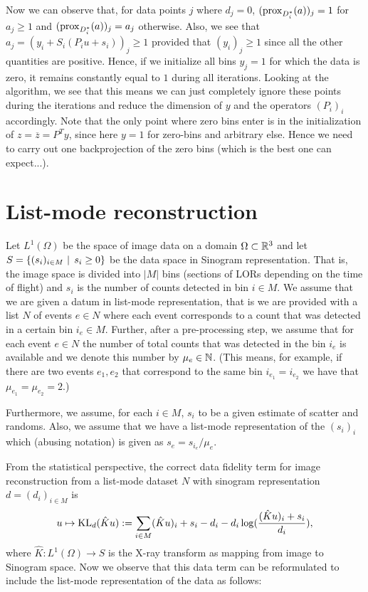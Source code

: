 \documentclass{article}
\begin{document}
Now we can observe that, for data points $j$ where $d_j = 0$, $(\operatorname{prox}_{D_i^*}(a))_j = 1$ for $a_j \geq 1$ and $(\operatorname{prox}_{D_i^*}(a))_j = a_j$ otherwise. Also, we see that $ a_j = (y_i + S_i (P_iu + s_i) )_j \geq 1$ provided that $(y_i)_j \geq 1$ since all the other quantities are positive. Hence, if we initialize all bins $y_j = 1$ for which the data is zero, it remains constantly equal to $1$ during all iterations. Looking at the algorithm, we see that this means we can just completely ignore these points during the iterations and reduce the dimension of $y$ and the operators $(P_i)_i$ accordingly. Note that the only point where zero bins enter is in the initialization of $z = \overline{z} = P^Ty$, since here $y = 1$ for zero-bins and arbitrary else. Hence we need to carry out one backprojection of the zero bins (which is the best one can expect...).

\section{List-mode reconstruction}

Let $L^1(\Omega)$ be the space of image data on a domain $\Omega \subset \mathbb{R}^3$ and let $S = \{ (s_i)_{i \in M} \, \left|\right.\, s_i \geq 0 \}$ be the data space in Sinogram representation. That is, the image space is divided into $|M|$ bins (sections of LORs depending on the time of flight) and $s_i$ is the number of counts detected in bin $i \in M$. We assume that we are given a datum in list-mode representation, that is we are provided with a list $N$ of events $e \in N $ where each event corresponds to a count that was detected in a certain bin $i_e \in M$. Further, after a pre-processing step, we assume that for each event $e \in N$ the number of total counts that was detected in the bin $i_e$ is available and we denote this number by $\mu_e \in \mathbb{N}$. (This means, for example, if there are two events $e_1,e_2$ that correspond to the same bin $i_{e_1} = i_{e_2}$ we have that $\mu_{e_1} = \mu_{e_2} = 2$.) 

Furthermore, we assume, for each $i \in M$, $s_i$ to be a given estimate of scatter and randoms. Also, we assume that we have a list-mode representation of the $(s_i)_i$ which (abusing notation) is given as $s_e = s_{i_e}/\mu_e$. 


From the statistical perspective, the correct data fidelity term for image reconstruction from a list-mode dataset $N$ with sinogram representation $d= (d_i)_{ i \in M}$ is 
\[ u \mapsto \operatorname{KL}_d(\hat{K}u):=  \sum_{i \in M} (\hat{K}u)_i + s_i  - d_i -d_i \log(\frac{(\hat{K}u)_i + s_i}{d_i} ) ,\]
where $\hat{K}:L^1(\Omega) \rightarrow S$ is the X-ray transform as mapping from image to Sinogram space. Now we observe that this data term can be reformulated to include the list-mode representation of the data as follows:
\end{document}
